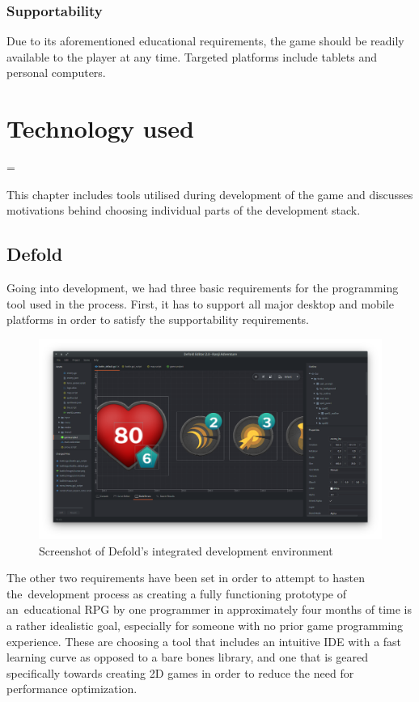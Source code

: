 \documentclass[thesis=B,english,hidelinks]{FITthesisXE}[2012/06/26]
\begin{document}
\subsection{Supportability}
Due to its aforementioned educational requirements, the game should be readily available to the player at any time. Targeted platforms include tablets and personal computers.

\chapter{Technology used}

\emergencystretch=\maxdimen
{}

This chapter includes tools utilised during development of the game and discusses motivations behind choosing individual parts of the development stack.

\section{Defold}

Going into development, we had three basic requirements for the programming tool used in the process. First, it has to support all major desktop and mobile platforms in order to satisfy the supportability requirements.

\begin{figure}[ht]
\centering
\includegraphics[scale=0.2]{defold}
\caption{Screenshot of Defold's integrated development environment}
\label{fig:defold}
\end{figure}

The other two requirements have been set in order to attempt to hasten the~development process as creating a fully functioning prototype of an~educational RPG by one programmer in approximately four months of time is a rather idealistic goal, especially for someone with no prior game programming experience. These are choosing a tool that includes an intuitive IDE with a fast learning curve as opposed to a bare bones library, and one that is geared specifically towards creating 2D games in order to reduce the need for performance optimization.
\end{document}
